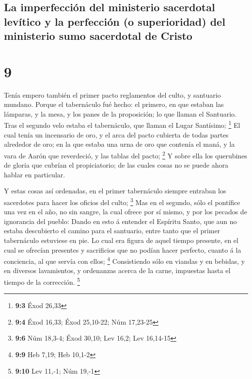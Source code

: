 \hypertarget{la-imperfecciuxf3n-del-ministerio-sacerdotal-levuxedtico-y-la-perfecciuxf3n-o-superioridad-del-ministerio-sumo-sacerdotal-de-cristo}{%
\subsection{La imperfección del ministerio sacerdotal levítico y la
perfección (o superioridad) del ministerio sumo sacerdotal de
Cristo}\label{la-imperfecciuxf3n-del-ministerio-sacerdotal-levuxedtico-y-la-perfecciuxf3n-o-superioridad-del-ministerio-sumo-sacerdotal-de-cristo}}

\hypertarget{section-8}{%
\section{9}\label{section-8}}

 Tenía empero también el primer pacto reglamentos del
culto, y santuario mundano.  Porque el tabernáculo fué
hecho: el primero, en que estaban las lámparas, y la mesa, y los panes
de la proposición; lo que llaman el Santuario.  Tras el
segundo velo estaba el tabernáculo, que llaman el Lugar Santísimo;
\footnote{\textbf{9:3} Éxod 26,33}  El cual tenía un
incensario de oro, y el arca del pacto cubierta de todas partes
alrededor de oro; en la que estaba una urna de oro que contenía el maná,
y la vara de Aarón que reverdeció, y las tablas del pacto; \footnote{\textbf{9:4}
  Éxod 16,33; Éxod 25,10-22; Núm 17,23-25}  Y sobre ella
los querubines de gloria que cubrían el propiciatorio; de las cuales
cosas no se puede ahora hablar en particular.

 Y estas cosas así ordenadas, en el primer tabernáculo
siempre entraban los sacerdotes para hacer los oficios del culto;
\footnote{\textbf{9:6} Núm 18,3-4; Éxod 30,10; Lev 16,2; Lev 16,14-15}
 Mas en el segundo, sólo el pontífice una vez en el año,
no sin sangre, la cual ofrece por sí mismo, y por los pecados de
ignorancia del pueblo:  Dando en esto á entender el
Espíritu Santo, que aun no estaba descubierto el camino para el
santuario, entre tanto que el primer tabernáculo estuviese en pie.
 Lo cual era figura de aquel tiempo presente, en el cual
se ofrecían presentes y sacrificios que no podían hacer perfecto, cuanto
á la conciencia, al que servía con ellos; \footnote{\textbf{9:9} Heb
  7,19; Heb 10,1-2}  Consistiendo sólo en viandas y en
bebidas, y en diversos lavamientos, y ordenanzas acerca de la carne,
impuestas hasta el tiempo de la corrección. \footnote{\textbf{9:10} Lev
  11,-1; Núm 19,-1}

